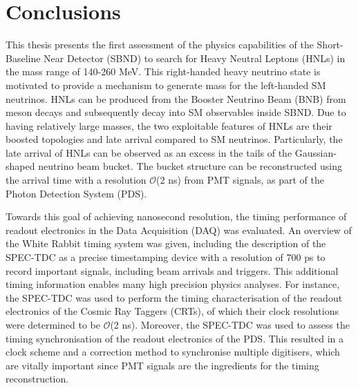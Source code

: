 
\chapter{Conclusions}  %


This thesis presents the first assessment of the physics capabilities of the Short-Baseline Near Detector (SBND) to search for Heavy Neutral Leptons (HNLs) in the mass range of 140-260 MeV.
This right-handed heavy neutrino state is motivated to provide a mechanism to generate mass for the left-handed SM neutrinos.
HNLs can be produced from the Booster Neutrino Beam (BNB) from meson decays and subsequently decay into SM observables inside SBND. 
Due to having relatively large masses, the two exploitable features of HNLs are their boosted topologies and late arrival compared to SM neutrinos.
Particularly, the late arrival of HNLs can be observed as an excess in the tails of the Gaussian-shaped neutrino beam bucket.
The bucket structure can be reconstructed using the arrival time with a resolution $\mathcal{O}$(2 ns) from PMT signals, as part of the Photon Detection System (PDS).

Towards this goal of achieving nanosecond resolution, the timing performance of readout electronics in the Data Acquisition (DAQ) was evaluated.
An overview of the White Rabbit timing system was given, including the description of the SPEC-TDC as a precise timestamping device with a resolution of 700 ps to record important signals, including beam arrivals and triggers.
This additional timing information enables many high precision physics analyses.
For instance, the SPEC-TDC was used to perform the timing characterisation of the readout electronics of the Cosmic Ray Taggers (CRTs), of which their clock resolutions were determined to be $\mathcal{O}$(2 ns).
Moreover, the SPEC-TDC was used to assess the timing synchronisation of the readout electronics of the PDS.
This resulted in a clock scheme and a correction method to synchronise multiple digitisers, which are vitally important since PMT signals are the ingredients for the timing reconstruction.

